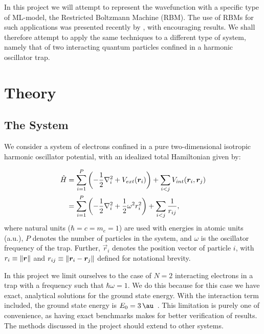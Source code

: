 \documentclass[a4paper, 11pt]{article}
\begin{document}
\begin{multicols}{2}
    In this project we will attempt to represent the wavefunction with a
    specific type of ML-model, the Restricted Boltzmann Machine (RBM). The use
    of RBMs for such applications was presented recently by
    \textcite{Carleo602}, with encouraging results. We shall therefore attempt
    to apply the same techniques to a different type of system, namely that of
    two interacting quantum particles confined in a harmonic oscillator trap.


    \section{Theory}

    \subsection{The System}

    We consider a system of electrons confined in a pure two-dimensional
    isotropic harmonic oscillator potential, with an idealized total Hamiltonian
    given by:

    \begin{align}
        \begin{split}
            \hat H &= \sum_{i=1}^P\qty(-\frac{1}{2}\laplacian_i + V_{ext}(\vec r_i)) +
            \sum_{i < j} V_{int}(\vec r_i, \vec r_j)\\
            &= \sum_{i=1}^P\qty(-\frac{1}{2}\laplacian_i + \frac{1}{2}\omega^2
            r_i^2) + \sum_{i < j} \frac{1}{r_{ij}},
        \end{split}\label{eq:H-def}
    \end{align}
    where natural units ($\hbar=c=m_e=1$) are used with energies in
    atomic units (a.u.), $P$ denotes the number of particles in the system, and
    $\omega$ is the oscillator frequency of the trap. Further, $\vec r_i$
    denotes the position vector of particle $i$, with $r_i \equiv \norm{\bm r}$ and
    $r_{ij}\equiv \norm{\bm r_i - \bm r_j}$ defined for notational brevity.

    In this project we limit ourselves to the case of $N=2$ interacting
    electrons in a trap with a frequency such that $\hbar \omega = 1$. We do
    this because for this case we have exact, analytical solutions for the
    ground state energy. With the interaction term included, the ground state
    energy is $E_0 = \SI{3}{\au}$~\cite{Taut1993}. This limitation is purely one
    of convenience, as having exact benchmarks makes for better verification of
    results. The methods discussed in the project should extend to other
    systems.


\end{multicols}
\end{document}
